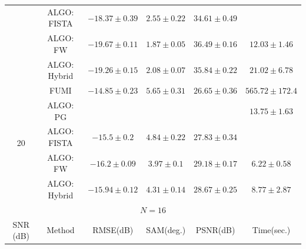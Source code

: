 \begin{table}[h]
{\begin{threeparttable}
\begin{tabular}{|c|c|c|c|c|c|}
                    & ALGO: FISTA            &                    {$-18.37\pm 0.39$} &                    {$2.55\pm 0.22$} &                    {$34.61\pm 0.49$} & \cellcolor{red! 10}{$9.05\pm 1.02$}      \tabularnewline
                    & ALGO: FW               &                    {$-19.67\pm 0.11$} &                    {$1.87\pm 0.05$} &                    {$36.49\pm 0.16$} &                    {$12.03\pm 1.46$}     \tabularnewline
                    & ALGO: Hybrid \tnote{1} &                    {$-19.26\pm 0.15$} &                    {$2.08\pm 0.07$} &                    {$35.84\pm 0.22$} &                    {$21.02\pm 6.78$}     \tabularnewline \hline \hline
\multirow{5}{*}{20} & FUMI                   &                    {$-14.85\pm 0.23$} &                    {$5.65\pm 0.31$} &                    {$26.65\pm 0.36$} &                    {$565.72\pm 172.4$}   \tabularnewline
                    & ALGO: PG               & \cellcolor{red! 10}{$-16.53\pm 0.04$} & \cellcolor{red! 10}{$3.65\pm 0.04$} & \cellcolor{red! 10}{$29.89\pm 0.09$} &                    {$13.75\pm 1.63$}     \tabularnewline
                    & ALGO: FISTA            &                    {$-15.5\pm 0.2$}   &                    {$4.84\pm 0.22$} &                    {$27.83\pm 0.34$} & \cellcolor{red! 10}{$5.57\pm 0.47$}      \tabularnewline
                    & ALGO: FW               &                    {$-16.2\pm 0.09$}  &                    {$3.97\pm 0.1$}  &                    {$29.18\pm 0.17$} &                    {$6.22\pm 0.58$}      \tabularnewline
                    & ALGO: Hybrid \tnote{1} &                    {$-15.94\pm 0.12$} &                    {$4.31\pm 0.14$} &                    {$28.67\pm 0.25$} &                    {$8.77\pm 2.87$}      \tabularnewline \hline \hline
\multicolumn{ 6}{|c|}{$N =16$} \tabularnewline \hline
SNR (dB)            & Method                 & RMSE(dB)                              & SAM(deg.)                           & PSNR(dB)                             & Time(sec.)                                \tabularnewline \hline

\end{tabular}
\end{threeparttable}}
\end{table}
